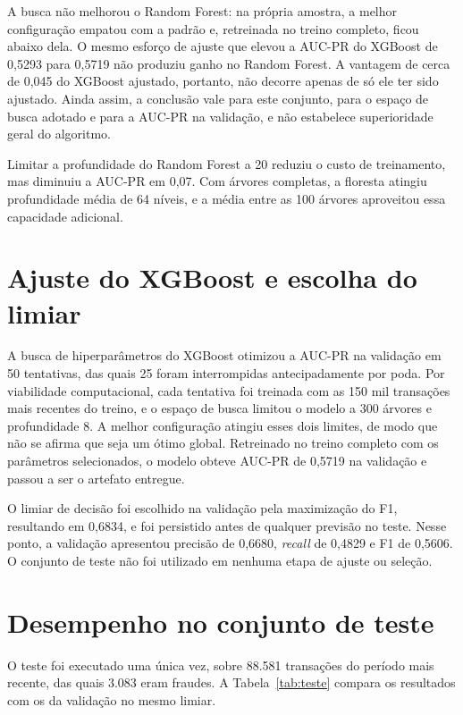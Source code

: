 A busca não melhorou o Random Forest: na própria amostra, a melhor configuração empatou com a padrão e, retreinada no treino completo, ficou abaixo dela. O mesmo esforço de ajuste que elevou a AUC-PR do XGBoost de 0,5293 para 0,5719 não produziu ganho no Random Forest. A vantagem de cerca de 0,045 do XGBoost ajustado, portanto, não decorre apenas de só ele ter sido ajustado. Ainda assim, a conclusão vale para este conjunto, para o espaço de busca adotado e para a AUC-PR na validação, e não estabelece superioridade geral do algoritmo.

Limitar a profundidade do Random Forest a 20 reduziu o custo de treinamento, mas diminuiu a AUC-PR em 0,07. Com árvores completas, a floresta atingiu profundidade média de 64 níveis, e a média entre as 100 árvores aproveitou essa capacidade adicional.

\section{Ajuste do XGBoost e escolha do limiar}

A busca de hiperparâmetros do XGBoost otimizou a AUC-PR na validação em 50 tentativas, das quais 25 foram interrompidas antecipadamente por poda. Por viabilidade computacional, cada tentativa foi treinada com as 150 mil transações mais recentes do treino, e o espaço de busca limitou o modelo a 300 árvores e profundidade 8. A melhor configuração atingiu esses dois limites, de modo que não se afirma que seja um ótimo global. Retreinado no treino completo com os parâmetros selecionados, o modelo obteve AUC-PR de 0,5719 na validação e passou a ser o artefato entregue.

O limiar de decisão foi escolhido na validação pela maximização do F1, resultando em 0,6834, e foi persistido antes de qualquer previsão no teste. Nesse ponto, a validação apresentou precisão de 0,6680, \emph{recall} de 0,4829 e F1 de 0,5606. O conjunto de teste não foi utilizado em nenhuma etapa de ajuste ou seleção.

\section{Desempenho no conjunto de teste}

O teste foi executado uma única vez, sobre 88.581 transações do período mais recente, das quais 3.083 eram fraudes. A Tabela~\ref{tab:teste} compara os resultados com os da validação no mesmo limiar.

